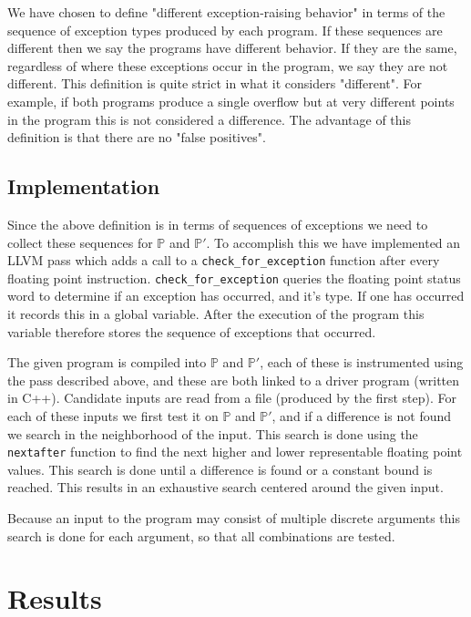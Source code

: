 \documentclass{article}
\begin{document}
We have chosen to define "different exception-raising behavior" in terms of the
sequence of exception types produced by each program. If these sequences are
different then we say the programs have different behavior. If they are the
same, regardless of where these exceptions occur in the program, we say they are
not different. This definition is quite strict in what it considers "different".
For example, if both programs produce a single overflow but at very different
points in the program this is not considered a difference. The advantage of this
definition is that there are no "false positives".

\subsection{Implementation}

Since the above definition is in terms of sequences of exceptions we need to
collect these sequences for $\mathbb{P}$ and $\mathbb{P'}$. To accomplish this
we have implemented an LLVM pass which adds a call to a
\texttt{check\_for\_exception} function after every floating point instruction.
\texttt{check\_for\_exception} queries the floating point status word
\cite{noauthor_status_nodate} to determine if an exception has occurred, and
it's type. If one has occurred it records this in a global variable. After the
execution of the program this variable therefore stores the sequence of
exceptions that occurred.

The given program is compiled into $\mathbb{P}$ and $\mathbb{P'}$, each of these
is instrumented using the pass described above, and these are both linked to a
driver program (written in C++). Candidate inputs are read from a file (produced
by the first step).  For each of these inputs we first test it on $\mathbb{P}$
and $\mathbb{P'}$, and if a difference is not found we search in the
neighborhood of the input. This search is done using the \texttt{nextafter}
function \cite{noauthor_nextafter3_nodate} to find the next higher and lower
representable floating point values. This search is done until a difference is
found or a constant bound is reached. This results in an exhaustive search
centered around the given input.

Because an input to the program may consist of multiple discrete arguments this
search is done for each argument, so that all combinations are tested.

\section{Results}
\end{document}
